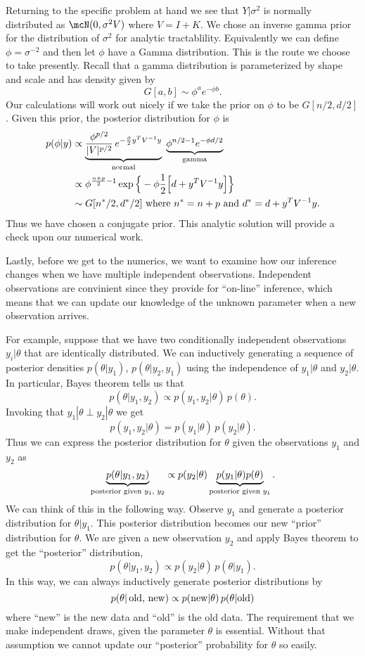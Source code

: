 \documentclass{report}
\begin{document}
Returning to the specific problem at hand we see that $Y | \sigma^2$ is normally distributed as $\mcN(0, \sigma^2 V )$ where $V = I + K$.  We chose an inverse gamma prior for the distribution of $\sigma^2$ for analytic tractablility.  Equivalently we can define $\phi = \sigma^{-2}$ and then let $\phi$ have a Gamma distribution.  This is the route we choose to take presently.  Recall that a gamma distribution is parameterized by shape and scale and has density given by
\[
G[a, b] \sim \phi^{a} e^{-\phi b}.
\]
Our calculations will work out nicely if we take the prior on $\phi$ to be $G[n/2, d/2]$.  Given this prior, the posterior distribution for $\phi$ is
\begin{align*}
p(\phi | y) & \propto \underbrace{\frac{\phi^{p/2}}{|V|^{p/2}} \, e^{-\frac{\phi}{2} y^T V^{-1} y}}_{\textmd{normal}} \; \underbrace{\phi^{n/2-1} e^{-\phi d/2}}_{\textmd{gamma}} \\
& \propto \phi^{\frac{n+p}{2} - 1} \exp \Big\{ - \phi \frac{1}{2}\Big[ d + y^T V^{-1} y \Big] \Big\} \\
& \sim G[n^*/2, d^*/2] \textmd{ where } n^* = n + p \textmd{ and } d^* = d + y^T V^{-1} y.
\end{align*}
Thus we have chosen a conjugate prior.  This analytic solution will provide a check upon our numerical work.

Lastly, before we get to the numerics, we want to examine how our inference changes when we have multiple independent observations.  Independent observations are convinient since they provide for ``on-line'' inference, which means that we can update our knowledge of the unknown parameter when a new observation arrives.

For example, suppose that we have two conditionally independent observations $y_i | \theta$ that are identically distributed.  We can inductively generating a sequence of posterior densities $p(\theta | y_1)$, $p(\theta| y_2, y_1)$ using the independence of $y_1 | \theta$ and $y_2 | \theta$.  In particular, Bayes theorem tells us that
\[
p(\theta | y_1, y_2) \propto p(y_1, y_2 | \theta) \, p(\theta).
\]
Invoking that $y_1 | \theta \perp y_2 | \theta$ we get
\[
p(y_1, y_2 | \theta) = p(y_1 | \theta) \, p(y_2 | \theta).
\]
Thus we can express the posterior distribution for $\theta$ given the observations $y_1$ and $y_2$ as
\[
\underbrace{p(\theta | y_1, y_2)}_{\textmd{posterior given $y_1$, $y_2$}}
\propto p(y_2 | \theta) 
\underbrace{p(y_1 | \theta) p(\theta)}_{\textmd{posterior given $y_1$}}.
\]
We can think of this in the following way.  Observe $y_1$ and generate a posterior distribution for $\theta | y_1$.  This posterior distribution becomes our new ``prior'' distribution for $\theta$.  We are given a new observation $y_2$ and apply Bayes theorem to get the ``posterior'' distribution,
\[
p(\theta | y_1, y_2) \propto p(y_2 | \theta) \, p(\theta | y_1).
\]
In this way, we can always inductively generate posterior distributions by
\[
p(\theta | \, \textmd{old, new}) \propto p(\textmd{new} | \theta) \, p(\theta | \textmd{old})
\]
where ``new'' is the new data and ``old'' is the old data.  The requirement that we make independent draws, given the parameter $\theta$ is essential.  Without that assumption we cannot update our ``posterior'' probability for $\theta$ so easily.
\end{document}
